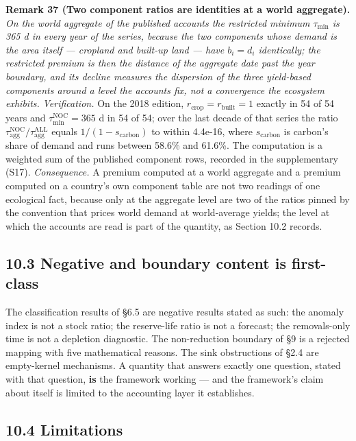 \documentclass[11pt]{article}
\begin{document}
\textbf{Remark 37 (Two component ratios are identities at a world aggregate).} \emph{On the world aggregate of the published accounts the restricted minimum \(\tau_{\min}\) is 365 d in every year of the series, because the two components whose demand is the area itself --- cropland and built-up land --- have \(b_i = d_i\) identically; the restricted premium is then the distance of the aggregate date past the year boundary, and its decline measures the dispersion of the three yield-based components around a level the accounts fix, not a convergence the ecosystem exhibits.} \emph{Verification.} On the 2018 edition, \(r_{\mathrm{crop}} =\allowbreak{} r_{\mathrm{built}} =\allowbreak{} 1\) exactly in 54 of 54 years and \(\tau_{\min}^{\mathrm{NOC}} =\allowbreak{} 365\) d in 54 of 54; over the last decade of that series the ratio \(\tau_{\mathrm{agg}}^{\mathrm{NOC}}/\tau_{\mathrm{agg}}^{\mathrm{ALL}}\) equals \(1/(1-s_{\mathrm{carbon}})\) to within 4.4e-16, where \(s_{\mathrm{carbon}}\) is carbon's share of demand and runs between 58.6\% and 61.6\%. The computation is a weighted sum of the published component rows, recorded in the supplementary (S17). \emph{Consequence.} A premium computed at a world aggregate and a premium computed on a country's own component table are not two readings of one ecological fact, because only at the aggregate level are two of the ratios pinned by the convention that prices world demand at world-average yields; the level at which the accounts are read is part of the quantity, as Section 10.2 records.

\subsection*{10.3 Negative and boundary content is first-class}\label{103-negative-and-boundary-content-is-first-class}

The classification results of \S6.5 are negative results stated as such: the anomaly index is not a stock ratio; the reserve-life ratio is not a forecast; the removals-only time is not a depletion diagnostic. The non-reduction boundary of \S9 is a rejected mapping with five mathematical reasons. The sink obstructions of \S2.4 are empty-kernel mechanisms. A quantity that answers exactly one question, stated with that question, \textbf{is} the framework working --- and the framework's claim about itself is limited to the accounting layer it establishes.

\subsection*{10.4 Limitations}\label{104-limitations}
\end{document}
